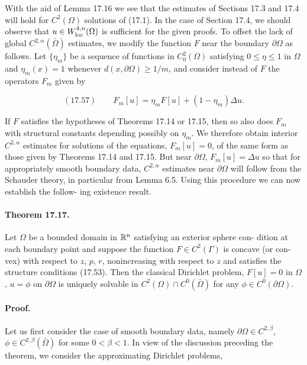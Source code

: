 \begin{flushleft}
With the aid of Lemma 17.16 we see that the estimates of Sections 17.3 and 17.4
will hold for $C^2(\Omega)$ solutions of (17.1). In the case of Section 17.4, we should observe
that $u \in W^{4,n}_{\mathrm{loc}}(\Omega)$ is sufficient for the given proofs. To offset the lack of global $C^{2,\alpha}(\bar{\Omega})$
estimates, we modify the function $F$ near the boundary $\partial\Omega$ as follows. Let $\{\eta_m\}$ be a
sequence of functions in $C^2_0(\Omega)$ satisfying $0 \leq \eta \leq 1$ in $\Omega$ and $\eta_m(x)=1$ whenever
$d(x,\partial\Omega)\geq 1/m$, and consider instead of $F$ the operators $F_m$ given by
\end{flushleft}

\[
(17.57)\qquad F_m[u]=\eta_m F[u]+(1-\eta_m)\Delta u.
\]

\begin{flushleft}
If $F$ satisfies the hypotheses of Theorems 17.14 or 17.15, then so also does $F_m$ with
structural constants depending possibly on $\eta_m$. We therefore obtain interior $C^{2,\alpha}$
estimates for solutions of the equations, $F_m[u]=0$, of the same form as those given
by Theorems 17.14 and 17.15. But near $\partial\Omega$, $F_m[u]=\Delta u$ so that for appropriately
smooth boundary data, $C^{2,\alpha}$ estimates near $\partial\Omega$ will follow from the Schauder theory,
in particular from Lemma 6.5. Using this procedure we can now establish the follow-
ing existence result.
\end{flushleft}

\paragraph{Theorem 17.17.}
Let $\Omega$ be a bounded domain in $\mathbb{R}^n$ satisfying an exterior sphere con-
dition at each boundary point and suppose the function $F \in C^2(\Gamma)$ is concave (or con-
vex) with respect to $z$, $p$, $r$, nonincreasing with respect to $z$ and satisfies the structure
conditions (17.53). Then the classical Dirichlet problem, $F[u]=0$ in $\Omega$, $u=\phi$ on
$\partial\Omega$ is uniquely solvable in $C^2(\Omega)\cap C^0(\bar\Omega)$ for any $\phi \in C^0(\partial\Omega)$.

\paragraph{Proof.}
Let us first consider the case of smooth boundary data, namely $\partial\Omega \in C^{2,\beta}$,
$\phi \in C^{2,\beta}(\bar\Omega)$ for some $0<\beta<1$. In view of the discussion preceding the theorem,
we consider the approximating Dirichlet problems,


